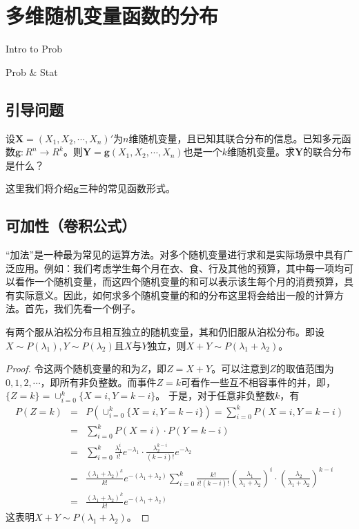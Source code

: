 \chapter{多维随机变量函数的分布}
\begin{introduction}
  \item Intro to Prob    
  \item Prob $\&$ Stat
\end{introduction}
\section{引导问题}
\begin{problem}
设$\bm{X} = \left(X_{1}, X_{2}, \cdots, X_{n}\right)'$为$n$维随机变量，且已知其联合分布的信息。已知多元函数$\bm{g}: R^{n} \rightarrow R^{k}$。则$\bm{Y} = \bm{g}(X_1,X_2,\cdots,X_n)$也是一个$k$维随机变量。求$\bm{Y}$的联合分布是什么？
\end{problem}
这里我们将介绍$\bm{g}$三种的常见函数形式。
\section{可加性（卷积公式）}
“加法”是一种最为常见的运算方法。对多个随机变量进行求和是实际场景中具有广泛应用。例如：我们考虑学生每个月在衣、食、行及其他的预算，其中每一项均可以看作一个随机变量，而这四个随机变量的和可以表示该生每个月的消费预算，具有实际意义。因此，如何求多个随机变量的和的分布这里将会给出一般的计算方法。首先，我们先看一个例子。

\begin{example}\label{ex:lect9_1}
有两个服从泊松分布且相互独立的随机变量，其和仍旧服从泊松分布。即设$X \sim P\left(\lambda_{1}\right), Y \sim P\left(\lambda_{2}\right)$且$X$与$Y$独立，则$X+Y \sim P(\lambda_{1}+\lambda_{2})$。
\end{example}
 \begin{proof}
  令这两个随机变量的和为$Z$，即$Z=X+Y$。可以注意到$Z$的取值范围为$0,1,2,\cdots$，即所有非负整数。而事件${Z=k}$可看作一些互不相容事件的并，即，$\{Z=k\}=\cup_{i=0}^{k}\{X=i, Y=k-i\}$。
  于是，对于任意非负整数$k$，有\begin{eqnarray*}
P(Z=k) &=&P\left(\cup_{i=0}^{k}\{X=i, Y=k-i\}\right) =\sum_{i=0}^{k} P\left(X=i, Y=k-i\right) \\
&=& \sum_{i=0}^{k} P(X=i) \cdot P(Y=k-i) \\
&=&\sum_{i=0}^{k} \frac{\lambda_{1}^{i}}{i !} e^{-\lambda_{1}} \cdot \frac{\lambda_{2}^{k-i}}{(k-i)!} e^{-\lambda_{2}} \\
&=&\frac{\left(\lambda_{1}+\lambda_{2}\right)^{k}}{k !} e^{-\left(\lambda_{1}+\lambda_{2}\right)} \sum_{i=0}^{k} \frac{k !}{i !(k-i) !}\left(\frac{\lambda_{1}}{\lambda_{1}+\lambda_{2}}\right)^{i} \cdot\left(\frac{\lambda_{2}}{\lambda_{1}+\lambda_{2}}\right)^{k-i} \\
&=&\frac{\left(\lambda_{1}+\lambda_{2}\right)^{k}}{k !} e^{-\left(\lambda_{1}+\lambda_{2}\right)}
\end{eqnarray*}
这表明$X+Y \sim P(\lambda_{1}+\lambda_{2})$。
 \end{proof}

